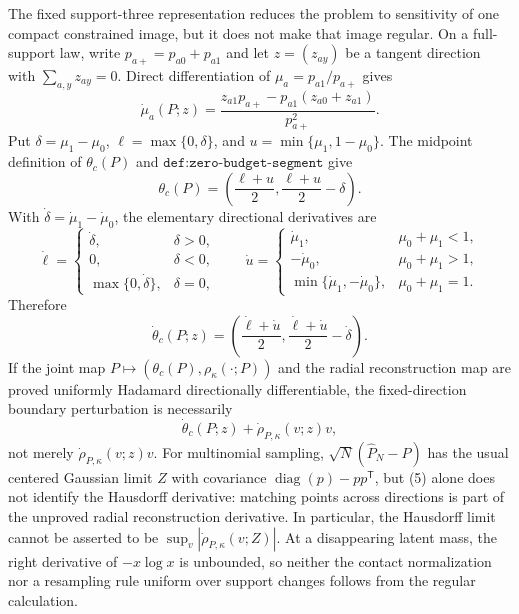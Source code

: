 The fixed support-three representation reduces the problem to sensitivity of one compact constrained image, but it does not make that image regular.  On a full-support law, write \(p_{a+}=p_{a0}+p_{a1}\) and let \(z=(z_{ay})\) be a tangent direction with \(\sum_{a,y}z_{ay}=0\).  Direct differentiation of \(\mu_a=p_{a1}/p_{a+}\) gives
\[
\dot\mu_a(P;z)=\frac{z_{a1}p_{a+}-p_{a1}(z_{a0}+z_{a1})}{p_{a+}^2}.
\tag{1}
\]
Put \(\delta=\mu_1-\mu_0\), \(\ell=\max\{0,\delta\}\), and \(u=\min\{\mu_1,1-\mu_0\}\).  The midpoint definition of \(\theta_c(P)\) and \(\texttt{def:zero-budget-segment}\) give
\[
\theta_c(P)=\left(\frac{\ell+u}{2},\frac{\ell+u}{2}-\delta\right).
\tag{2}
\]
With \(\dot\delta=\dot\mu_1-\dot\mu_0\), the elementary directional derivatives are
\[
\dot\ell=
\begin{cases}
\dot\delta,&\delta>0,\\
0,&\delta<0,\\
\max\{0,\dot\delta\},&\delta=0,
\end{cases}
\qquad
\dot u=
\begin{cases}
\dot\mu_1,&\mu_0+\mu_1<1,\\
-\dot\mu_0,&\mu_0+\mu_1>1,\\
\min\{\dot\mu_1,-\dot\mu_0\},&\mu_0+\mu_1=1.
\end{cases}
\tag{3}
\]
Therefore
\[
\dot\theta_c(P;z)=
\left(\frac{\dot\ell+\dot u}{2},
\frac{\dot\ell+\dot u}{2}-\dot\delta\right).
\tag{4}
\]
If the joint map \(P\mapsto(\theta_c(P),\rho_\kappa(\cdot;P))\) and the radial reconstruction map are proved uniformly Hadamard directionally differentiable, the fixed-direction boundary perturbation is necessarily
\[
\dot\theta_c(P;z)+\dot\rho_{P,\kappa}(v;z)v,
\tag{5}
\]
not merely \(\dot\rho_{P,\kappa}(v;z)v\).  For multinomial sampling, \(\sqrt N(\widehat P_N-P)\) has the usual centered Gaussian limit \(Z\) with covariance \(\operatorname{diag}(p)-pp^{\mathsf T}\), but (5) alone does not identify the Hausdorff derivative: matching points across directions is part of the unproved radial reconstruction derivative.  In particular, the Hausdorff limit cannot be asserted to be \(\sup_v|\dot\rho_{P,\kappa}(v;Z)|\).  At a disappearing latent mass, the right derivative of \(-x\log x\) is unbounded, so neither the contact normalization nor a resampling rule uniform over support changes follows from the regular calculation.